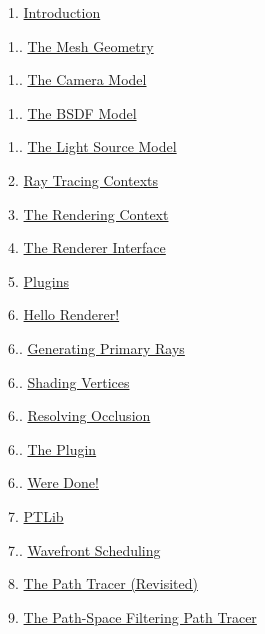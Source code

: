 \begin{DoxyParagraph}{}

\begin{DoxyItemize}
\item 1. \hyperlink{_overture_page}{Introduction} 
\begin{DoxyItemize}
\item 1.. \hyperlink{_overture_page_MeshesSection}{The Mesh Geometry} 
\item 1.. \hyperlink{_overture_page_CameraSection}{The Camera Model} 
\item 1.. \hyperlink{_overture_page_BSDFSection}{The B\+S\+DF Model} 
\item 1.. \hyperlink{_overture_page_LightSection}{The Light Source Model} 
\end{DoxyItemize}
\item 2. \hyperlink{_r_t_context_page}{Ray Tracing Contexts} 
\item 3. \hyperlink{_rendering_context_page}{The Rendering Context} 
\item 4. \hyperlink{_renderer_interface_page}{The Renderer Interface} 
\item 5. \hyperlink{_plugins_page}{Plugins} 
\item 6. \hyperlink{_hello_renderer_page}{Hello Renderer!} 
\begin{DoxyItemize}
\item 6.. \hyperlink{_hello_renderer_page_HelloPTGeneratingPrimaryRaysSection}{Generating Primary Rays} 
\item 6.. \hyperlink{_hello_renderer_page_HelloPTShadingVerticesSection}{Shading Vertices} 
\item 6.. \hyperlink{_hello_renderer_page_HelloPTSolvingOcclusionSection}{Resolving Occlusion} 
\item 6.. \hyperlink{_hello_renderer_page_HelloPTPluginSection}{The Plugin} 
\item 6.. \hyperlink{_hello_renderer_page_HelloPTDoneSection}{We\textquotesingle{}re Done!} 
\end{DoxyItemize}
\item 7. \hyperlink{_p_t_lib_page}{P\+T\+Lib} 
\begin{DoxyItemize}
\item 7.. \hyperlink{_p_t_lib_page_PTWavefrontSchedulingSection}{Wavefront Scheduling} 
\end{DoxyItemize}
\item 8. \hyperlink{_p_t_page}{The Path Tracer (Revisited)} 
\item 9. \hyperlink{_p_s_f_p_t_page}{The Path-\/\+Space Filtering Path Tracer} 

\end{DoxyItemize}
\end{DoxyParagraph}
